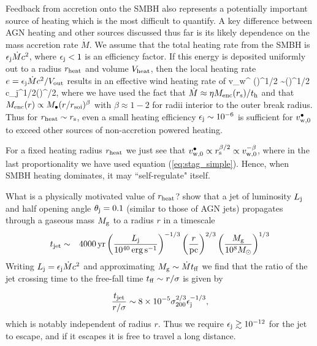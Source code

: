 \documentclass[usenatbib,fleqn]{mn2e}
\begin{document}
Feedback from accretion onto the SMBH also represents a potentially important source of heating which is the most difficult to quantify.  A key difference between AGN heating and other sources discussed thus far is its likely dependence on the mass accretion rate $\dot{M}$.  We assume that the total heating rate from the SMBH is $\epsilon_{\rm j} \dot{M}c^{2}$, where $\epsilon_{\rm j} < 1$ is an efficiency factor.  If this energy is deposited uniformly out to a radius $r_{\rm heat}$ and volume $V_{\rm heat}$, then the local heating rate $e = \epsilon_{\rm j}\dot{M}c^{2}/V_{\rm out}$ results in an effective wind heating rate of
\be
v_w^{\bullet} \approx  \left(\right)^{1/2} \sim \left(\right)^{1/2} \approx c\epsilon_{\rm j}^{1/2}\left(\right)^{\beta/2},
\ee
where we have used the fact that $\dot{M} \approx \eta M_{\rm enc}(r_{\rm s})/t_{\rm h}$ and that $M_{\rm enc}(r) \propto M_{\bullet}(r/r_{\rm soi})^{\beta}$ with $\beta \approx 1-2$ for radii interior to the outer break radius.  Thus for $r_{\rm heat} \sim r_{\rm s}$, even a small heating efficiency $\epsilon_{\rm j} \sim 10^{-6}$ is sufficient for $v_{\rm w,0}^{\bullet}$ to exceed other sources of non-accretion powered heating.  

For a fixed heating radius $r_{\rm heat}$ we just see that $v_{\rm w,0}^{\bullet} \propto r_{\rm s}^{\beta/2} \propto v_{\rm w,0}^{-\beta}$, where in the last proportionality we have used equation (\ref{eq:stag_simple}).  Hence, when SMBH heating dominates, it may ``self-regulate" itself.    

What is a physically motivated value of $r_{\rm heat}$?  \citet{Bromberg+11} show that a jet of luminosity $L_{\rm j}$ and half opening angle $\theta_{\rm j} = 0.1$ (similar to those of AGN jets) propagates through a gaseous mass $M_{\rm g}$ to a radius $r$ in a timescale
\begin{eqnarray}
t_{\rm jet} &\sim& 4000\,{\rm yr}\left(\frac{{L}_{\rm j}}{10^{40}\,\rm erg\,s^{-1}}\right)^{-1/3}\left(\frac{r}{\rm pc}\right)^{2/3}\left(\frac{M_{\rm g}}{10^{8}M_{\odot}}\right)^{1/3} 
\end{eqnarray}
Writing $L_{\rm j} = \epsilon_{\rm j}\dot{M}c^{2}$ and approximating $M_{\rm g} \sim \dot{M}t_{\rm ff}$ we find that the ratio of the jet crossing time to the free-fall time $t_{\rm ff} \sim r/\sigma$ is given by

\begin{equation}
\frac{t_{\rm jet}}{r/\sigma} \sim 8\times 10^{-5}\sigma_{200}^{2/3}\epsilon_{\rm j}^{-1/3},
\end{equation}
which is notably independent of radius $r$.  Thus we require $\epsilon_{\rm j} \gtrsim 10^{-12}$ for the jet to escape, and if it escapes it is free to travel a long distance. 
\end{document}
